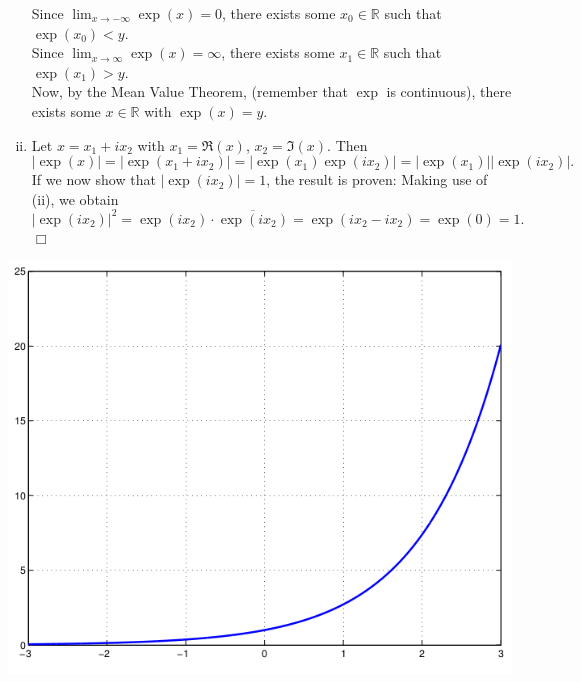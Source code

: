 \begin{enumerate}[(i)]
Since $\lim_{x\to-\infty}\exp(x)=0$, there exists some $x_0\in\mathbb{R}$ such that $\exp(x_0)<y$.\\
Since $\lim_{x\to\infty}\exp(x)=\infty$, there exists some $x_1\in\mathbb{R}$ such that $\exp(x_1)>y$.\\
Now, by the Mean Value Theorem, (remember that $\exp$ is continuous), there exists some $x\in\mathbb{R}$ with $\exp(x)=y$.
\item Let $x=x_1+ix_2$ with $x_1=\Re(x)$, $x_2=\Im(x)$. Then
\[
 | \exp(x) | =
|\exp(x_1+ix_2)|=|\exp(x_1)\exp(ix_2)|=|\exp(x_1)||\exp(ix_2)|.\]
If we now show that $|\exp(ix_2)|=1$, the result is proven:
Making use of (ii), we obtain
\[|\exp(ix_2)|^2=\exp(ix_2)\cdot\overline{\exp(ix_2)}=\exp(ix_2-ix_2)=\exp(0)=1.\]\hfill$\Box$
\end{enumerate}

\includegraphics{./exp.png}

